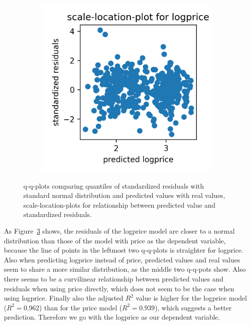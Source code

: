 \documentclass[12 pt]{scrartcl}
\begin{document}
\begin{figure}[htb]
\begin{subfigure}[b]{0.32\textwidth}
    \label{fig:qqplotyyhatlogprice}
  \end{subfigure}
  \begin{subfigure}[b]{0.32\textwidth}
    \centering
    \includegraphics[width=\textwidth]{./images/scalelocationplot_logprice.png}
    \label{fig:scalelocationplotlogprice}
  \end{subfigure}
  \caption{q-q-plots comparing quantiles of standardized residuals with standard normal distribution and predicted values with real values, scale-location-plots for relationship between predicted value and standardized residuals.}
  \label{fig:pricevslogprice}
\end{figure}

As Figure~\ref{fig:pricevslogprice} shows, the residuals of the logprice model are closer to a normal distribution than those of the model with price as the dependent variable, because the line of points in the leftmost two q-q-plots is straighter for logprice. Also when predicting logprice instead of price, predicted values and real values seem to share a more similar distribution, as the middle two q-q-pots show. Also there seems to be a curvilinear relationship between predicted values and residuals when using price directly, which does not seem to be the case when using logprice. Finally also the adjusted $R^2$ value is higher for the logprice model ($R^2 = 0.962$) than for the price model ($R^2 = 0.939$), which suggests a better prediction. Therefore we go with the logprice as our dependent variable.
\end{document}
